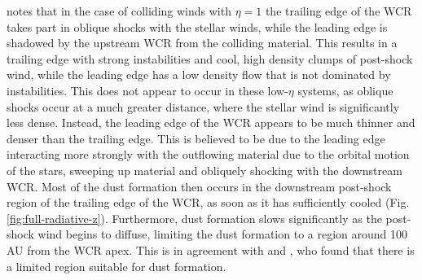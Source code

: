 \documentclass[fleqn,usenatbib]{mnras}
\begin{document}
\cite{pittard_3d_2009} notes that in the case of colliding winds with $\eta = 1$ the trailing edge of the WCR takes part in oblique shocks with the stellar winds, while the leading edge is shadowed by the upstream WCR from the colliding material.
This results in a trailing edge with strong instabilities and cool, high density clumps of post-shock wind, while the leading edge has a low density flow that is not dominated by instabilities.
This does not appear to occur in these low-$\eta$ systems, as oblique shocks occur at a much greater distance, where the stellar wind is significantly less dense.
Instead, the leading edge of the WCR appears to be much thinner and denser than the trailing edge.
This is believed to be due to the leading edge interacting more strongly with the outflowing material due to the orbital motion of the stars, sweeping up material and obliquely shocking with the downstream WCR. %
Most of the dust formation then occurs in the downstream post-shock region of the trailing edge of the WCR, as soon as it has sufficiently cooled (Fig. \ref{fig:full-radiative-z}).
Furthermore, dust formation slows significantly as the post-shock wind begins to diffuse, limiting the dust formation to a region around 100 AU from the WCR apex. %
This is in agreement with \cite{williams_dust_1990} and \cite{hendrix_pinwheels_2016}, who found that there is a limited region suitable for dust formation.
\end{document}
